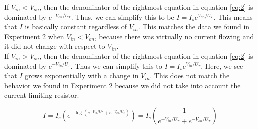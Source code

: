 \documentclass{article}
\begin{document}
\begin{itemize}
        If $V_{in} < V_{on}$, then the denominator of the rightmost equation in equation \ref{eq:2} is dominated by $e^{-V_{on}/U_T}$. Thus, we can simplify this to be $I = I_se^{V_{on}/U_T}$. This means that $I$ is basically constant regardless of $V_{in}$. This matches the data we found in Experiment 2 when $V_{in} < V_{on}$, because there was virtually no current flowing and it did not change with respect to $V_{in}$. \\

        If $V_{in} > V_{on}$, then the denominator of the rightmost equation in equation \ref{eq:2} is dominated by $e^{-V_{in}/U_T}$. Thus we can simplify this to $I = I_se^{V_{in}/U_T}$. Here, we see that $I$ grows exponentially with a change in $V_{in}$. This does not match the behavior we found in Experiment 2 because we did not take into account the current-limiting resistor.

        \begin{equation} \label{eq:2}
            I = I_s\left(e^{-\log(e^{-V_{in}/U_T} + e^{-V_{on}/U_T})}\right) = I_s\left(\frac{1}{e^{-V_{in}/U_T} + e^{-V_{on}/U_T}} \right)
        \end{equation}
\end{itemize}
\end{document}
